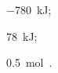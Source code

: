   \begin{solution}
    \begin{enumerate*}
      \item \SI{-780}{\kilo\joule};
      \item \SI{78}{\kilo\joule};
      \item \SI{0.5}{\mole{}}.
    \end{enumerate*}
  \end{solution}
